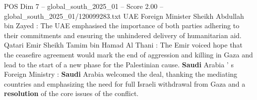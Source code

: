 \begin{textsample}{POS Dim 7 – global\_south\_2025\_01 – Score 2.00 – global\_south\_2025\_01/120099283.txt}
UAE Foreign Minister Sheikh Abdullah bin Zayed : The UAE emphasised the importance of both parties adhering to their commitments and ensuring the unhindered delivery of humanitarian aid.
Qatari Emir Sheikh Tamim bin Hamad Al Thani : The Emir voiced hope that the ceasefire agreement would mark the end of aggression and killing in Gaza and lead to the start of a new phase for the Palestinian cause. \textbf{Saudi} Arabia ' s Foreign Ministry : \textbf{Saudi} Arabia welcomed the deal, thanking the mediating countries and emphasizing the need for full Israeli withdrawal from Gaza and a \textbf{resolution} of the core issues of the conflict.

\end{textsample}
